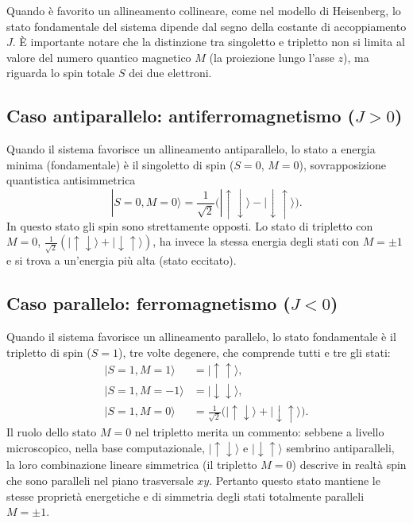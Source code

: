 \documentclass[11pt,a4paper]{article}
\begin{document}
Quando \`e favorito un allineamento collineare, come nel modello di Heisenberg, lo
stato fondamentale del sistema dipende dal segno della costante di accoppiamento $J$.
\`E importante notare che la distinzione tra singoletto e tripletto non si limita al
valore del numero quantico magnetico $M$ (la proiezione lungo l'asse $z$), ma riguarda
lo spin totale $S$ dei due elettroni.

\subsection{Caso antiparallelo: antiferromagnetismo ($J>0$)}

Quando il sistema favorisce un allineamento antiparallelo, lo stato a energia minima
(fondamentale) \`e il singoletto di spin ($S=0$, $M=0$), sovrapposizione quantistica
antisimmetrica
$$|S=0,M=0\rangle=\frac1{\sqrt2}\big(|\!\uparrow\downarrow\rangle-|\!\downarrow\uparrow\rangle\big).$$
In questo stato gli spin sono strettamente opposti. Lo stato di tripletto con $M=0$,
$\tfrac1{\sqrt2}(|\!\uparrow\downarrow\rangle+|\!\downarrow\uparrow\rangle)$, ha invece
la stessa energia degli stati con $M=\pm1$ e si trova a un'energia pi\`u alta (stato
eccitato).

\subsection{Caso parallelo: ferromagnetismo ($J<0$)}

Quando il sistema favorisce un allineamento parallelo, lo stato fondamentale \`e il
tripletto di spin ($S=1$), tre volte degenere, che comprende tutti e tre gli stati:
\begin{align}
|S=1,M=1\rangle &= |\!\uparrow\uparrow\rangle, \\
|S=1,M=-1\rangle &= |\!\downarrow\downarrow\rangle, \\
|S=1,M=0\rangle &= \frac1{\sqrt2}\big(|\!\uparrow\downarrow\rangle+|\!\downarrow\uparrow\rangle\big).
\end{align}
Il ruolo dello stato $M=0$ nel tripletto merita un commento: sebbene a livello
microscopico, nella base computazionale, $|\!\uparrow\downarrow\rangle$ e
$|\!\downarrow\uparrow\rangle$ sembrino antiparalleli, la loro combinazione lineare
simmetrica (il tripletto $M=0$) descrive in realt\`a spin che sono paralleli nel piano
trasversale $xy$. Pertanto questo stato mantiene le stesse propriet\`a energetiche e di
simmetria degli stati totalmente paralleli $M=\pm1$.
\end{document}
